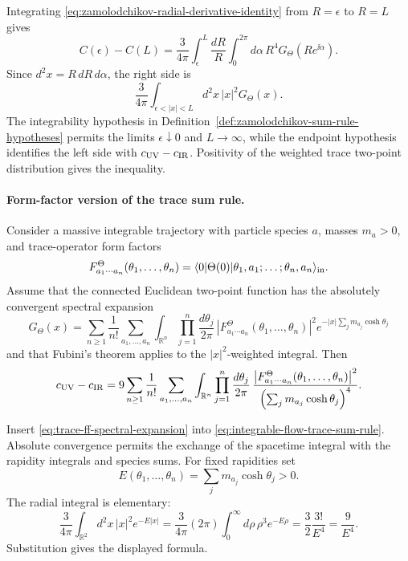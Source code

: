 Integrating \eqref{eq:zamolodchikov-radial-derivative-identity} from
\(R=\epsilon\) to \(R=L\) gives
\[
  C(\epsilon)-C(L)
  =
  \frac{3}{4\pi}
  \int_\epsilon^L \frac{dR}{R}
  \int_0^{2\pi}d\alpha\,
  R^4G_\Theta(R e^{\ii\alpha}).
\]
Since \(d^2x=R\,dR\,d\alpha\), the right side is
\[
  \frac{3}{4\pi}
  \int_{\epsilon<|x|<L}d^2x\, |x|^2G_\Theta(x).
\]
The integrability hypothesis in
Definition~\ref{def:zamolodchikov-sum-rule-hypotheses} permits the limits
\(\epsilon\downarrow0\) and \(L\to\infty\), while the endpoint hypothesis
identifies the left side with \(c_{\rm UV}-c_{\rm IR}\).  Positivity of the
weighted trace two-point distribution gives the inequality.

\paragraph{Form-factor version of the trace sum rule.}
Consider a massive integrable trajectory with particle species \(a\), masses
\(m_a>0\), and trace-operator form factors
\[
  F^{\Theta}_{a_1\cdots a_n}(\theta_1,\ldots,\theta_n)
  =
  \langle 0|\Theta(0)|
  \theta_1,a_1;\ldots;\theta_n,a_n\rangle_{\rm in}.
\]
Assume that the connected Euclidean two-point function has the absolutely
convergent spectral expansion
\begin{equation}
  G_\Theta(x)
  =
  \sum_{n\geq1}\frac1{n!}
  \sum_{a_1,\ldots,a_n}
  \int_{\mathbb R^n}\prod_{j=1}^n\frac{d\theta_j}{2\pi}\,
  \left|F^{\Theta}_{a_1\cdots a_n}(\theta_1,\ldots,\theta_n)\right|^2
  e^{-|x|\sum_j m_{a_j}\cosh\theta_j}
  \label{eq:trace-ff-spectral-expansion}
\end{equation}
and that Fubini's theorem applies to the \(|x|^2\)-weighted integral.  Then
\begin{equation}
  c_{\rm UV}-c_{\rm IR}
  =
  9
  \sum_{n\geq1}\frac1{n!}
  \sum_{a_1,\ldots,a_n}
  \int_{\mathbb R^n}\prod_{j=1}^n\frac{d\theta_j}{2\pi}\,
  \frac{
  \left|F^{\Theta}_{a_1\cdots a_n}(\theta_1,\ldots,\theta_n)\right|^2}
  {\left(\sum_j m_{a_j}\cosh\theta_j\right)^4}.
  \label{eq:trace-form-factor-c-sum-rule}
\end{equation}

Insert \eqref{eq:trace-ff-spectral-expansion} into
\eqref{eq:integrable-flow-trace-sum-rule}.  Absolute convergence permits the
exchange of the spacetime integral with the rapidity integrals and species
sums.  For fixed rapidities set
\[
  E(\theta_1,\ldots,\theta_n)=\sum_j m_{a_j}\cosh\theta_j>0 .
\]
The radial integral is elementary:
\[
  \frac{3}{4\pi}
  \int_{\mathbb R^2}d^2x\,|x|^2e^{-E|x|}
  =
  \frac{3}{4\pi}(2\pi)
  \int_0^\infty d\rho\,\rho^3e^{-E\rho}
  =
  \frac{3}{2}\frac{3!}{E^4}
  =
  \frac9{E^4}.
\]
Substitution gives the displayed formula.

